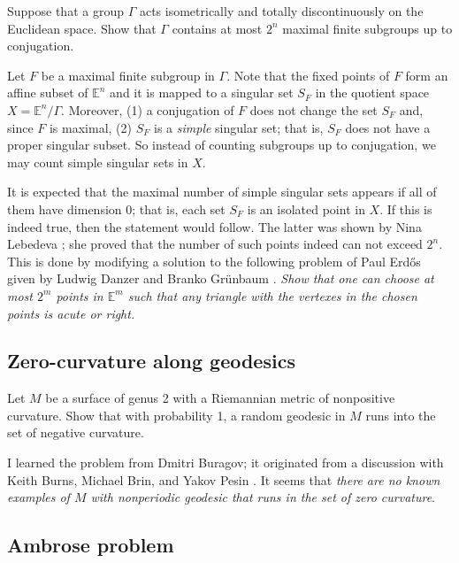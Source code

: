 \begin{pr}
Suppose that a group $\Gamma$ acts isometrically and totally discontinuously on the Euclidean space.
Show that $\Gamma$ contains at most $2^n$ maximal finite subgroups up to conjugation.
\end{pr}

Let $F$ be a maximal finite subgroup in $\Gamma$.
Note that the fixed points of $F$ form an affine subset of $\mathbb{E}^n$ and it is mapped to a singular set $S_F$ in the quotient space $X=\mathbb{E}^n/\Gamma$.
Moreover, (1) a conjugation of $F$ does not change the set $S_F$ and, since $F$ is maximal, (2) $S_F$ is a \emph{simple} singular set;
that is, $S_F$ does not have a proper singular subset.
So instead of counting subgroups up to conjugation, we may count simple singular sets in $X$.

It is expected that the maximal number of simple singular sets appears if all of them have dimension 0;
that is, each set $S_F$ is an isolated point in $X$.
If this is indeed true, then the statement would follow.
The latter was shown by  Nina Lebedeva \cite{lebedeva};
she proved that the number of such points indeed can not exceed $2^n$.
This is done by modifying a solution to the following problem of Paul Erdős given by Ludwig Danzer and Branko Gr{\"u}nbaum \cite{danzer-guenbaum}.
\emph{Show that one can choose at most $2^m$ points in $\mathbb{E}^m$ such that any triangle with the vertexes in the chosen points is acute or right.}

\subsection*{Zero-curvature along geodesics}

\begin{pr}
Let $M$ be a surface of genus 2 with a Riemannian metric of nonpositive curvature.
Show that with probability 1, a random geodesic in $M$ runs into the set of negative curvature.
\end{pr}

I learned the problem from 
Dmitri Buragov; it originated from a discussion with Keith Burns, Michael Brin, and Yakov Pesin \cite[see also][]{hertz}.
It seems that \textit{there are no known examples of $M$ with nonperiodic geodesic that runs in the set of zero curvature}.

\subsection*{Ambrose problem}

